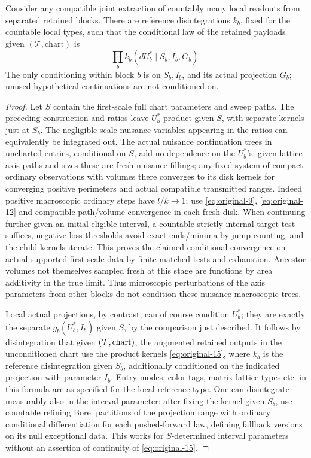 \begin{theorem}\label{kern:product-kernels}
Consider any compatible joint extraction of countably many local readouts from separated retained
blocks. There are reference disintegrations \(k_b\), fixed for the countable local types, such that
the conditional law of the retained payloads given \((\mathcal T,\text{chart})\) is
\begin{equation}\label{eq:original-15}
 \prod_b k_b(dU_b^*\mid S_b,I_b,G_b).
\end{equation}
The only conditioning within block $b$ is on $S_b,I_b$, and its actual
projection $G_b$; unused hypothetical continuations are not conditioned on.
\end{theorem}
\begin{proof}

Let \(S\) contain the first-scale full chart parameters and sweep paths. The preceding construction and
ratios leave \(U_b^*\) product given \(S\), with separate kernels just at \(S_b\). The negligible-scale
nuisance variables appearing in the ratios can equivalently be integrated out. The actual nuisance
continuation trees in uncharted entries, conditional on \(S\), add no dependence on the \(U_b^*\)'s: given
lattice axis paths and sizes these are fresh nuisance fillings; any fixed system of compact ordinary
observations with volumes there converges to its disk kernels for converging positive perimeters and actual
compatible transmitted ranges. Indeed positive macroscopic ordinary steps have \(l/k\to 1\); use
\eqref{eq:original-9}, \eqref{eq:original-12} and compatible path/volume convergence in each fresh disk.
When continuing further given an initial eligible interval, a countable strictly internal target test
suffices, negative loss thresholds avoid exact ends/minima by jump counting, and the child kernels iterate.
This proves the claimed conditional convergence on actual supported first-scale data by finite matched tests
and exhaustion. Ancestor volumes not themselves sampled fresh at this stage are functions by area additivity
in the true limit. Thus microscopic perturbations of the axis parameters from other blocks do not condition
these nuisance macroscopic trees.

Local actual projections, by contrast, can of course condition \(U_b^*\);
they are exactly the separate \(g_b(U_b^*,I_b)\) given \(S\), by the comparison just described. It follows
by disintegration that given \(({\cal T},\text{chart})\), the augmented retained outputs in the
unconditioned chart use the product kernels
\eqref{eq:original-15},
where \(k_b\) is the reference disintegration given \(S_b\), additionally conditioned on the indicated
projection with parameter \(I_b\). Entry modes, color tags, matrix lattice types etc. in this formula are as
specified for the local reference type. One can disintegrate measurably also in the interval parameter:
after fixing the kernel given \(S_b\), use countable refining Borel partitions of the projection range with
ordinary conditional differentiation for each pushed-forward law, defining fallback versions on its null
exceptional data. This works for \(S\)-determined interval parameters without an assertion of continuity of
\eqref{eq:original-15}.


\end{proof}
